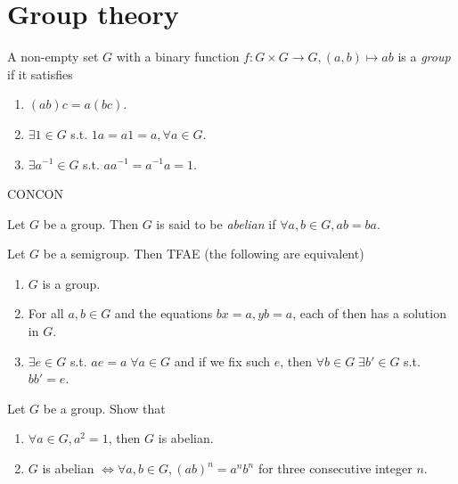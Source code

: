 \section{Group theory}

\begin{definition}
  A non-empty set $G$ with a binary function $f: G \times G \to G,
  (a, b) \mapsto ab$
  is a {\it group} if it satisfies
  \begin{enumerate}
    \item $(ab)c = a(bc)$.
    \item $\exists 1 \in G$ s.t. $1a = a1 = a, \forall a \in G$.
    \item $\exists a^{-1} \in G$ s.t. $aa^{-1} = a^{-1}a = 1$.
  \end{enumerate}
\end{definition}

CONCON

\begin{definition}
  Let $G$ be a group. Then $G$ is said to be {\it abelian} if
  $\forall a, b \in G, ab = ba$.
\end{definition}

\begin{exercise}
  Let $G$ be a semigroup. Then TFAE (the following are equivalent)
  \begin{enumerate}
    \item $G$ is a group.
    \item For all $a, b \in G$ and the equations $bx=a, yb=a$, each of then
      has a solution in $G$.
    \item $\exists e \in G$ s.t. $ae=a \; \forall a \in G$ and if we fix
      such $e$, then $\forall b \in G \; \exists b' \in G$ s.t. $bb' = e$.
  \end{enumerate}
\end{exercise}

\begin{exercise}
  Let $G$ be a group. Show that
  \begin{enumerate}
    \item $\forall a \in G, a^2 = 1$, then $G$ is abelian.
    \item $G$ is abelian $\iff \forall a, b \in G, (ab)^n = a^n b^n$ for three
      consecutive integer $n$.
  \end{enumerate}
\end{exercise}

